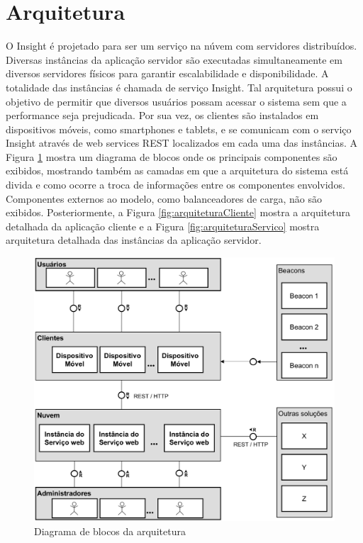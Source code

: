 \documentclass[english,brazilian]{UNISINOSmonografia}
\begin{document}
	\section{Arquitetura}
O Insight é projetado para ser um serviço na núvem com servidores distribuídos. Diversas instâncias da aplicação servidor são executadas simultaneamente em diversos servidores físicos para garantir escalabilidade e disponibilidade. A totalidade das instâncias é chamada de serviço Insight. Tal arquitetura possui o objetivo de permitir que diversos usuários possam acessar o sistema sem que a performance seja prejudicada. Por sua vez, os clientes são instalados em dispositivos móveis, como smartphones e tablets, e se comunicam com o serviço Insight através de web services REST localizados em cada uma das instâncias. A Figura \ref{fig:arquitetura} mostra um diagrama de blocos onde os principais componentes são exibidos, mostrando também as camadas em que a arquitetura do sistema está divida e como ocorre a troca de informações entre os componentes envolvidos. Componentes externos ao modelo, como balanceadores de carga, não são exibidos. Posteriormente, a Figura \ref{fig:arquiteturaCliente} mostra a arquitetura detalhada da aplicação cliente e a Figura \ref{fig:arquiteturaServico} mostra arquitetura detalhada das instâncias da aplicação servidor.


\begin{figure}[!ht]
	\caption{Diagrama de blocos da arquitetura}
	\label{fig:arquitetura}
	\centering%
	\begin{minipage}{.8\textwidth}
		\includegraphics[width=\textwidth]{imgs/arquitetura.png}
	\end{minipage}
\end{figure}
\end{document}
